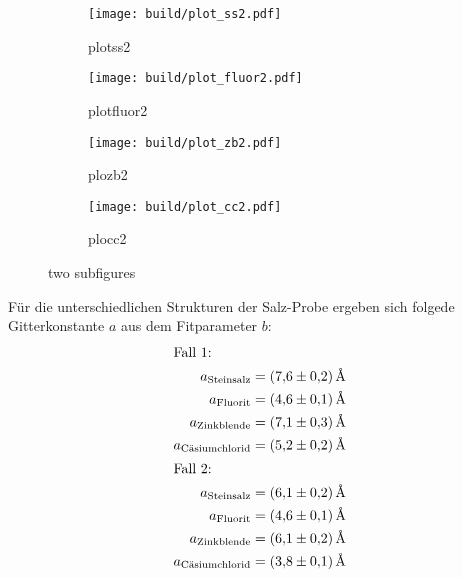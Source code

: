 \begin{figure}[hhh]
  \centering
  \begin{subfigure}{.45\textwidth}
    \centering
    \texttt{[image: build/plot\_ss2.pdf]}
    \caption{plotss2}
    \label{subfig:cool21}
  \end{subfigure}
  \begin{subfigure}{.45\textwidth}
    \centering
    \texttt{[image: build/plot\_fluor2.pdf]}
    \caption{plotfluor2}
    \label{subfig:cool22}
  \end{subfigure}
  \begin{subfigure}{.45\textwidth}
    \centering
    \texttt{[image: build/plot\_zb2.pdf]}
    \caption{plozb2}
    \label{subfig:cool23}
  \end{subfigure}
  \begin{subfigure}{.45\textwidth}
    \centering
    \texttt{[image: build/plot\_cc2.pdf]}
    \caption{plocc2}
    \label{subfig:cool24}
  \end{subfigure}
  \caption{two subfigures}
  \label{fig:very cool2}
\end{figure}
\FloatBarrier
Für die unterschiedlichen Strukturen der Salz-Probe ergeben sich folgede Gitterkonstante $a$
aus dem Fitparameter $b$:
\begin{align*}
\intertext{Fall 1:}
a_{\text{Steinsalz}}&=\SI{7.6(2)}{\angstrom}\\
a_{\text{Fluorit}}&=\SI{4.6(1)}{\angstrom}\\
a_{\text{Zinkblende}}&=\SI{7.1(3)}{\angstrom}\\
a_{\text{Cäsiumchlorid}} &=\SI{5.2(2)}{\angstrom}\\
\intertext{Fall 2:}
a_{\text{Steinsalz}}&=\SI{6.1(2)}{\angstrom}\\
a_{\text{Fluorit}}&=\SI{4.6(1)}{\angstrom}\\
a_{\text{Zinkblende}}&=\SI{6.1(2)}{\angstrom}\\
a_{\text{Cäsiumchlorid}} &=\SI{3.8(1)}{\angstrom}
\end{align*}
